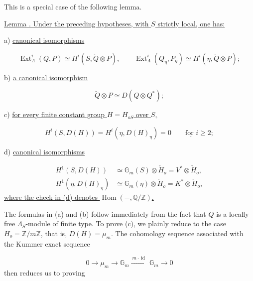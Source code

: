 This is a special case of the following lemma.

\medskip
\noindent
\underline{Lemma . Under the preceding hypotheses, with $S$ strictly
local, one has:}

\smallskip
\noindent
a) \underline{canonical isomorphisms}

\begin{equation*}
\operatorname{Ext}^i_\Lambda(Q,P)\simeq
H^i(S,\check Q\otimes P),
\qquad
\operatorname{Ext}^i_\Lambda(Q_\eta,P_\eta)\simeq
H^i(\eta,\check Q\otimes P);
\end{equation*}

\noindent
b) \underline{a canonical isomorphism}

\begin{equation}\tag{b)}
\check Q\otimes P\simeq D(Q\otimes Q^*);
\end{equation}

\noindent
c) \underline{for every finite constant group $H=H_{oS}$ over $S$,}

\begin{equation}\tag{c)}
H^i(S,D(H))=H^i(\eta,D(H)_\eta)=0
\qquad\underline{\text{for }}i\geq2;
\end{equation}

\noindent
d) \underline{canonical isomorphisms}

\begin{equation}\tag{d)}
\begin{aligned}
H^1(S,D(H))&\simeq\mathbb G_m(S)\otimes\check H_o
              =V^*\otimes\check H_o,\\
H^1(\eta,D(H)_\eta)&\simeq\mathbb G_m(\eta)\otimes\check H_o
              =K^*\otimes\check H_o,
\end{aligned}
\end{equation}
\underline{where the check in (d) denotes $\operatorname{Hom}(-,\mathbb
Q/\mathbb Z)$.}

The formulas in (a) and (b) follow immediately from the fact that $Q$ is a
locally free $\Lambda_S$-module of finite type. To prove (c), we plainly
reduce to the case $H_o=\mathbb Z/m\mathbb Z$, that is,
$D(H)=\mu_m$. The cohomology sequence associated with the Kummer exact
sequence

\begin{equation*}
0\longrightarrow\mu_m\longrightarrow\mathbb G_m
 \xrightarrow{\ m\cdot\operatorname{id}\ }\mathbb G_m
 \longrightarrow0
\end{equation*}
then reduces us to proving

